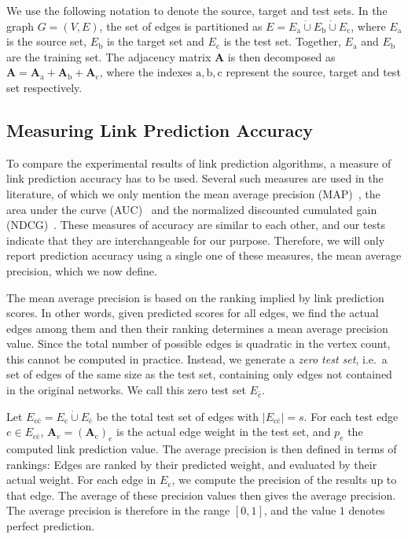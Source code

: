 \documentclass[11pt,a4paper]{book}
\newcommand{\dunion}{\mathbin{\dot\cup}} %
\begin{document}
We use the following notation to denote the source, target and test
sets.  In the graph $G=(V,E)$, the set of edges is partitioned as $E =
E_{\mathrm a} \dunion E_{\mathrm b} \dunion E_{\mathrm c}$, where
$E_{\mathrm a}$ is the source set, $E_{\mathrm b}$ is the target set and
$E_{\mathrm c}$ is the test set.  Together, $E_{\mathrm a}$ and
$E_{\mathrm b}$ are the training set.  The adjacency matrix $\mathbf A$
is then decomposed as $\mathbf A = \mathbf A_{\mathrm a} + \mathbf
A_{\mathrm b} + \mathbf A_{\mathrm c}$, where the indexes $\mathrm a,
\mathrm b, \mathrm c$ represent the source, target and test set
respectively.

\subsection{Measuring Link Prediction Accuracy}
\label{sec:map}
To compare the experimental results of link prediction algorithms, a
measure of link prediction accuracy has to be used.  Several such
measures are used in the literature, of which we only mention the mean
average precision (MAP)~\cite{b272}, the area under the curve
(AUC)~\cite{b366} and the 
normalized discounted cumulated gain (NDCG)~\cite{b160}.  These measures
of accuracy 
are similar to each other, and our tests indicate that they are
interchangeable for our purpose. Therefore, we will only report
prediction accuracy using a single one of these measures, the mean average
precision, which we now define. 

The mean average precision is based on the ranking implied by link
prediction scores.  In other words, given predicted scores for all
edges, we find the actual edges among them and then their ranking
determines a mean average precision value.  Since the total number of
possible edges is quadratic in the vertex count, this cannot be computed in
practice.  Instead, we generate a \emph{zero test set}, i.e.\ a set of
edges of the same size as the test set, containing only edges not contained
in the original networks.  We call this zero test set $E_{\bar c}$.  

Let $E_{\mathrm c\mathrm{\bar c}} = E_{\mathrm c} \dunion
E_{\mathrm{\bar c}}$ be the total test set of 
edges with $|E_{\mathrm c\mathrm{\bar c}}|=s$. 
For each test edge $e \in E_{\mathrm c\mathrm{\bar c}}$, $\mathbf A_{e}
= (\mathbf A_{\mathrm c})_e$  
is the actual 
edge weight in the test set, and $p_e$ the computed link prediction
value. 
The average precision is then defined in terms of rankings:  Edges
are ranked by their predicted weight, and evaluated by their actual
weight. 
For each edge in $E_{\mathrm c}$, we compute the precision of the results up to
that edge.  The average of these precision values then gives the average
precision.  The average precision is therefore in the range $[0,1]$, and
the value $1$ denotes perfect prediction. 
\end{document}
